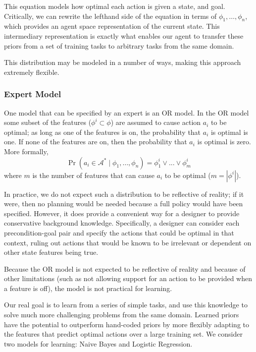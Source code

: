 \documentclass[11pt]{article}
\begin{document}
This equation models how optimal each action is given a state, and goal. Critically, we can rewrite the lefthand side of the equation in terms of $\phi_1, \ldots, \phi_n$, which provides an agent space representation of the current state. This intermediary representation is exactly what enables our agent to transfer these priors from a set of training tasks to arbitrary tasks from the same domain.

This distribution may be modeled in a number of ways, making this approach extremely flexible.

\subsubsection{Expert Model} One model that can be specified by
an expert is an OR model.
In the OR model some subset of the features 
($\phi^i \subset \phi$) are
assumed to cause action $a_i$ to be optimal; as long as one of
the features is on, the probability that $a_i$ is optimal is one.
If none of the features are on, then the probability that $a_i$ is 
optimal is zero. More formally,
\begin{equation}
\Pr(a_i \in \mathcal{A}^*  \mid \phi_1, \ldots, \phi_n) = \phi_1^i \lor ... \lor \phi_m^i
\end{equation}
where $m$ is the number of features that can cause $a_i$ to be optimal ($m = |\phi^i|$).

In practice, we do not expect such a distribution to be reflective of
reality; if it were, then no planning would be needed because a full
policy would have been specified. However, it does provide a
convenient way for a designer to provide conservative background
knowledge. Specifically, a designer can consider each precondition-goal
pair and specify the actions that could be optimal in that context, ruling
out actions that would be known to be irrelevant or dependent on other
state features being true.

Because the OR model is not expected to be reflective of
reality and because of other limitations (such as not allowing support
for an action to be provided when a feature is off), the model is not
practical for learning.

Our real goal is to learn from a series of simple tasks, and use this knowledge to solve much more challenging problems from the same domain.
Learned priors have the potential to outperform
hand-coded priors by more flexibly adapting to the
features that predict optimal actions over a large training set. 
We consider two models for learning: Naive Bayes and Logistic Regression.
\end{document}
